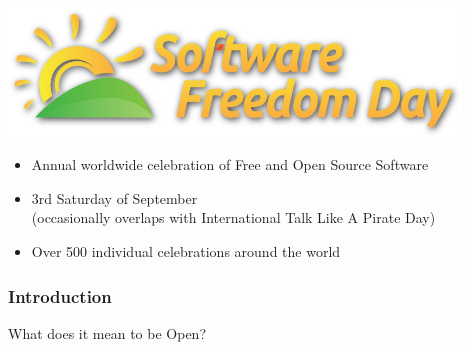 \documentclass{beamer}
\begin{document}
\begin{frame}
  \vspace{-1em}
  \begin{center} \includegraphics[width=0.9\textwidth]{../img/sfd} \end{center}
  \begin{large}
    \begin{itemize}
    \item Annual worldwide celebration of Free and Open Source
      Software
    \item 3rd Saturday of September \\ (occasionally overlaps with
      International Talk Like A Pirate Day)
    \item Over 500 individual celebrations around the world
    \end{itemize}
  \end{large}

\end{frame}

\begin{frame}
  \frametitle{Introduction}
  \begin{center}\begin{LARGE}What does it mean to be Open?\end{LARGE}\end{center}
\end{frame}
\end{document}
